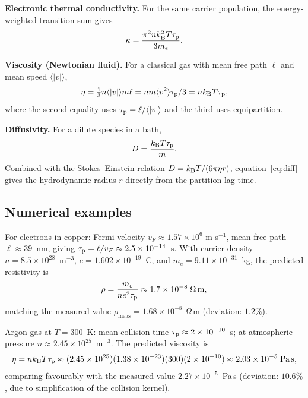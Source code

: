 \noindent\textbf{Electronic thermal conductivity.}
For the same carrier population, the energy-weighted transition sum gives
\begin{equation}
  \kappa = \frac{\pi^2 n k_{\mathrm{B}}^2 T \tau_{\mathrm{p}}}{3 m_e}.
  \label{eq:kappa}
\end{equation}

\noindent\textbf{Viscosity (Newtonian fluid).}
For a classical gas with mean free path $\ell$ and mean speed
$\langle |v| \rangle$,
\begin{equation}
  \eta
  = \tfrac{1}{3} n \langle |v| \rangle m \ell
  = n m \langle v^2 \rangle \tau_{\mathrm{p}} / 3
  = n k_{\mathrm{B}} T \tau_{\mathrm{p}},
  \label{eq:eta}
\end{equation}
where the second equality uses $\tau_{\mathrm{p}} = \ell / \langle |v| \rangle$ and
the third uses equipartition.

\noindent\textbf{Diffusivity.}
For a dilute species in a bath,
\begin{equation}
  D = \frac{k_{\mathrm{B}} T \tau_{\mathrm{p}}}{m}.
  \label{eq:diff}
\end{equation}
Combined with the Stokes--Einstein relation $D = k_{\mathrm{B}} T / (6\pi\eta r)$,
equation~\eqref{eq:diff} gives the hydrodynamic radius $r$ directly from
the partition-lag time.

\subsection{Numerical examples}

\begin{example}
\label{ex:Cu}
For electrons in copper: Fermi velocity $v_F \approx 1.57 \times 10^6$
m s$^{-1}$, mean free path $\ell \approx 39$~nm, giving
$\tau_{\mathrm{p}} = \ell / v_F \approx 2.5 \times 10^{-14}$~s.
With carrier density $n = 8.5 \times 10^{28}$~m$^{-3}$,
$e = 1.602 \times 10^{-19}$~C, and
$m_e = 9.11 \times 10^{-31}$~kg, the predicted resistivity is
\[
  \rho = \frac{m_e}{ne^2\tau_{\mathrm{p}}}
  \approx 1.7 \times 10^{-8}\;\Omega\,\mathrm{m},
\]
matching the measured value $\rho_{\mathrm{meas}} = 1.68 \times 10^{-8}$
$\Omega$\,m (deviation: $1.2\%$).
\end{example}

\begin{example}
\label{ex:Ar}
Argon gas at $T = 300$~K: mean collision time
$\tau_{\mathrm{p}} \approx 2 \times 10^{-10}$~s; at atmospheric pressure
$n \approx 2.45 \times 10^{25}$~m$^{-3}$.
The predicted viscosity is
\[
  \eta = nk_{\mathrm{B}} T \tau_{\mathrm{p}}
  \approx (2.45\times10^{25})(1.38\times10^{-23})(300)(2\times10^{-10})
  \approx 2.03 \times 10^{-5}\;\mathrm{Pa\,s},
\]
comparing favourably with the measured value
$2.27 \times 10^{-5}$~Pa\,s (deviation: $10.6\%$, due to simplification
of the collision kernel).
\end{example}

